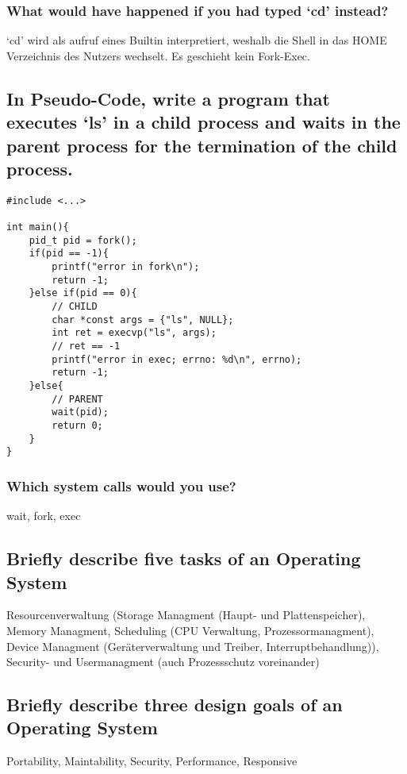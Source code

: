 \subsubsection{What would have happened if you had typed `cd' instead?}
`cd' wird als aufruf eines Builtin interpretiert, weshalb die Shell in das HOME Verzeichnis des Nutzers wechselt.
Es geschieht kein Fork-Exec.

\subsection{In Pseudo-Code, write a program that executes `ls' in a child process and waits in the parent process for the termination of the child process.}

\lstset{language=C}
\begin{lstlisting}
#include <...>

int main(){
    pid_t pid = fork();
    if(pid == -1){
        printf("error in fork\n");
        return -1;
    }else if(pid == 0){
        // CHILD
        char *const args = {"ls", NULL};
        int ret = execvp("ls", args);
        // ret == -1
        printf("error in exec; errno: %d\n", errno);
        return -1;
    }else{
        // PARENT
        wait(pid);
        return 0;
    }
}
\end{lstlisting}


\subsubsection{Which system calls would you use?}
wait, fork, exec

\subsection{Briefly describe five tasks of an Operating System}
Resourcenverwaltung (Storage Managment (Haupt- und Plattenspeicher), Memory Managment, Scheduling (CPU Verwaltung, Prozessormanagment), Device Managment (Geräterverwaltung und Treiber, Interruptbehandlung)),
Security- und Usermanagment (auch Prozessschutz voreinander)

\subsection{Briefly describe three design goals of an Operating System}
Portability, Maintability, Security, Performance, Responsive


